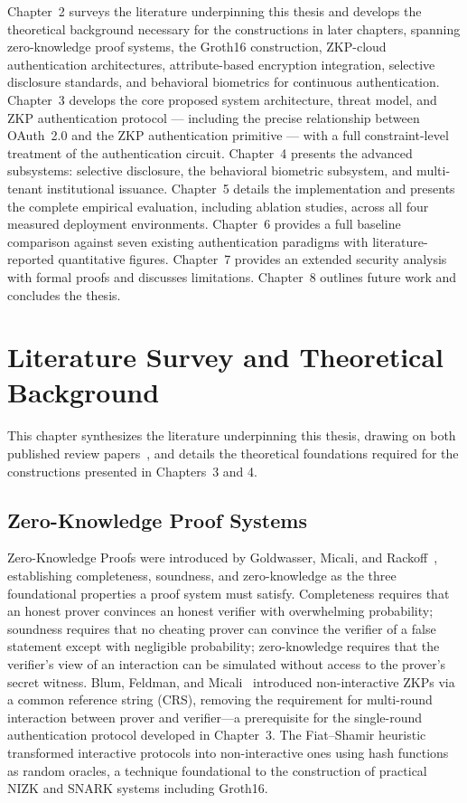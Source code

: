 \documentclass[12pt,a4paper,oneside]{report}
\begin{document}
Chapter~2 surveys the literature underpinning this thesis and develops the
theoretical background necessary for the constructions in later chapters,
spanning zero-knowledge proof systems, the Groth16 construction, ZKP-cloud
authentication architectures, attribute-based encryption integration,
selective disclosure standards, and behavioral biometrics for continuous
authentication. Chapter~3 develops the core proposed system architecture,
threat model, and ZKP authentication protocol --- including the precise
relationship between OAuth~2.0 and the ZKP authentication primitive ---
with a full constraint-level treatment of the authentication circuit.
Chapter~4 presents the advanced subsystems: selective disclosure, the
behavioral biometric subsystem, and multi-tenant institutional issuance.
Chapter~5 details the implementation and presents the complete empirical
evaluation, including ablation studies, across all four measured
deployment environments. Chapter~6 provides a full baseline comparison
against seven existing authentication paradigms with literature-reported
quantitative figures. Chapter~7 provides an extended security analysis
with formal proofs and discusses limitations. Chapter~8 outlines future
work and concludes the thesis.

\chapter{Literature Survey and Theoretical Background}

This chapter synthesizes the literature underpinning this thesis, drawing on
both published review papers~\cite{dandge2025zkpcloud,prasad2025abereview},
and details the theoretical foundations required for the constructions
presented in Chapters~3 and 4.

\section{Zero-Knowledge Proof Systems}

Zero-Knowledge Proofs were introduced by Goldwasser, Micali, and
Rackoff~\cite{goldreich94}, establishing completeness, soundness, and
zero-knowledge as the three foundational properties a proof system must
satisfy. Completeness requires that an honest prover convinces an honest
verifier with overwhelming probability; soundness requires that no
cheating prover can convince the verifier of a false statement except with
negligible probability; zero-knowledge requires that the verifier's view
of an interaction can be simulated without access to the prover's secret
witness. Blum, Feldman, and Micali~\cite{bfm88} introduced non-interactive
ZKPs via a common reference string (CRS), removing the requirement for
multi-round interaction between prover and verifier---a prerequisite for
the single-round authentication protocol developed in Chapter~3. The
Fiat--Shamir heuristic~\cite{fiatshamir} transformed interactive protocols
into non-interactive ones using hash functions as random oracles, a
technique foundational to the construction of practical NIZK and SNARK
systems including Groth16.
\end{document}
